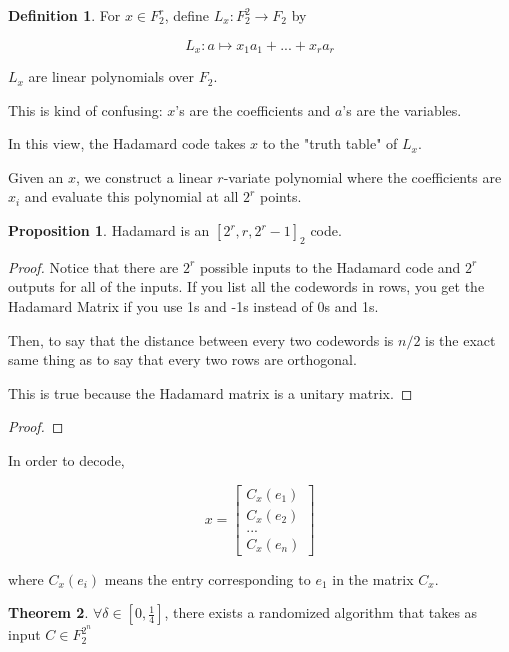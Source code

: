 \documentclass{article}
\theoremstyle{definition}
\newtheorem{definition}{Definition}
\newtheorem{theorem}{Theorem}[section]
\newtheorem{proposition}[theorem]{Proposition}
\begin{document}
\begin{definition}
    For $x \in F_{2}^{r}$, define $L_{x}: F_{2}^{2} \xrightarrow{} F_{2}$ by 

    \[ L_{x} : a \mapsto x_{1}a_{1} + ... + x_{r}a_{r} \]

    $L_{x}$ are linear polynomials over $F_{2}$.
\end{definition}

This is kind of confusing: $x$'s are the coefficients and $a$'s are the variables.

In this view, the Hadamard code takes $x$ to the "truth table" of $L_{x}$.

Given an $x$, we construct a linear $r$-variate polynomial where the coefficients are $x_{i}$
and evaluate this polynomial at all $2^{r}$ points.

\begin{proposition}
    Hadamard is an $[2^{r},r,2^{r} - 1]_{2}$ code.
\end{proposition}
\begin{proof}
    Notice that there are $2^{r}$ possible inputs to the Hadamard code
    and $2^{r}$ outputs for all of the inputs. If you list all the codewords
    in rows, you get the Hadamard Matrix if you use 1s and -1s instead of
    0s and 1s.

    Then, to say that the distance between every two codewords is $n/2$
    is the exact same thing as to say that every two rows are orthogonal.

    This is true because the Hadamard matrix is a unitary matrix.
\end{proof}
\begin{proof}
    
\end{proof}


In order to decode,

\[ x = \begin{bmatrix}
    C_{x}(e_{1}) \\ 
    C_{x}(e_{2}) \\
    ... \\
    C_{x}(e_{n})
\end{bmatrix}\]

where $C_{x}(e_{i})$ means the entry corresponding to $e_{1}$ in the matrix $C_{x}$.

\begin{theorem}
    $\forall \delta \in [0, \frac{1}{4}]$, there exists a randomized algorithm that takes as input
    $C \in F_{2}^{2^{n}}$ 
\end{theorem}
\end{document}
